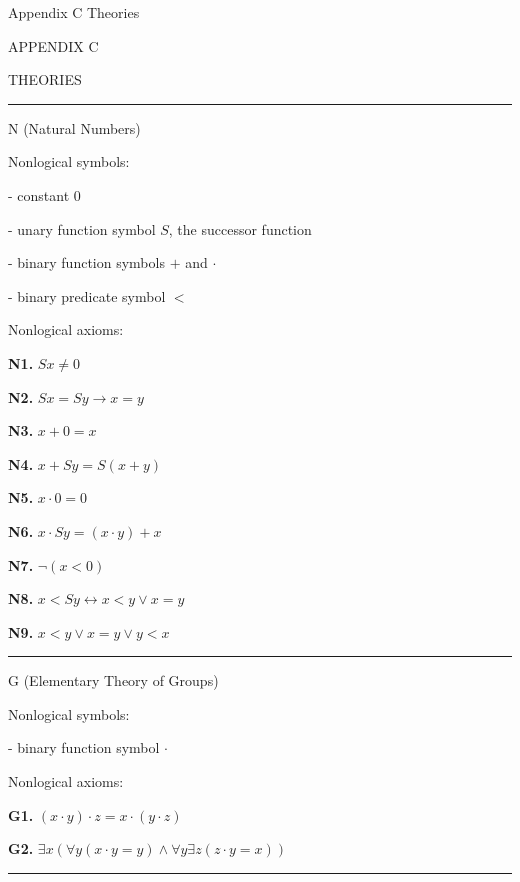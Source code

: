  {Appendix C Theories}
\centerline{\xmplbxi APPENDIX C}
\medskip
\centerline{\xmplbx THEORIES}
\bigskip

\hrule
\beginsection N (Natural Numbers)

Nonlogical symbols:
\item{-} constant $0$
\item{-} unary function symbol $S$, the successor function
\item{-} binary function symbols $+$ and $\cdot$
\item{-} binary predicate symbol $<$
\smallskip

\noindent Nonlogical axioms:
\item{} {\bf N1.} $Sx \ne 0$
\item{} {\bf N2.} $Sx = Sy \to x = y$
\item{} {\bf N3.} $x + 0 = x$
\item{} {\bf N4.} $x + Sy = S(x + y)$
\item{} {\bf N5.} $x \cdot 0 = 0$
\item{} {\bf N6.} $x \cdot Sy = (x \cdot y) + x$
\item{} {\bf N7.} $\neg (x < 0)$
\item{} {\bf N8.} $x < Sy \leftrightarrow x < y \lor x = y$
\item{} {\bf N9.} $x < y \lor x = y \lor y < x$
\smallskip
\hrule

\beginsection G (Elementary Theory of Groups)

Nonlogical symbols:
\item{-} binary function symbol $\cdot$
\smallskip

\noindent Nonlogical axioms:
\item{} {\bf G1.} $(x \cdot y) \cdot z = x \cdot (y \cdot z)$
\item{} {\bf G2.} $\exists x(\forall y(x \cdot y = y) \land \forall y \exists z(z \cdot y = x))$
\smallskip
\hrule

\vfill
\break
